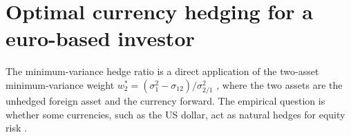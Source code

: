 \section{Optimal currency hedging for a euro-based investor}\label{sec:hedging}


The minimum-variance hedge ratio is a direct application of the two-asset minimum-variance weight $w_2^* = (\sigma_1^2 - \sigma_{12})/\sigma_{2/1}^2$ \citep{milhau2026}, where the two assets are the unhedged foreign asset and the currency forward.
The empirical question is whether some currencies, such as the US dollar, act as natural hedges for equity risk \citep{campbell2010}.
